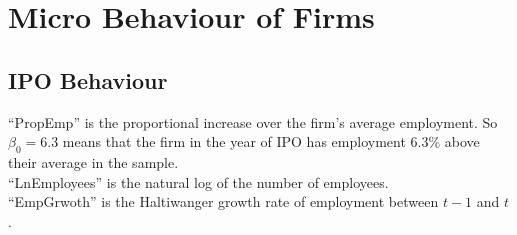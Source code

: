 \documentclass[12pt,notitlepage]{article}
\begin{document}


\FloatBarrier
\section{Micro Behaviour of Firms} %
\label{sec:micro_behaviour_of_firms}
\subsection{IPO Behaviour} %
\label{sec:ipo_behaviour}
\FloatBarrier


\begin{table}[!htpb]
\caption{Number of data points x years after an IPO}
    \begin{center}
    \end{center}
\end{table}



\begin{table}[!htpb]
\caption{IPO Regressions}
    \begin{center}


    \end{center}
        ``PropEmp'' is the proportional increase over the firm's average employment. So $\beta_0=$6.3 means that the firm in the year of IPO has employment 6.3\% above their average in the sample.\\
    ``LnEmployees'' is the natural log of the number of employees. \\
    ``EmpGrwoth'' is the Haltiwanger growth rate of employment between $t-1$ and $t$. 
\end{table}
\end{document}
